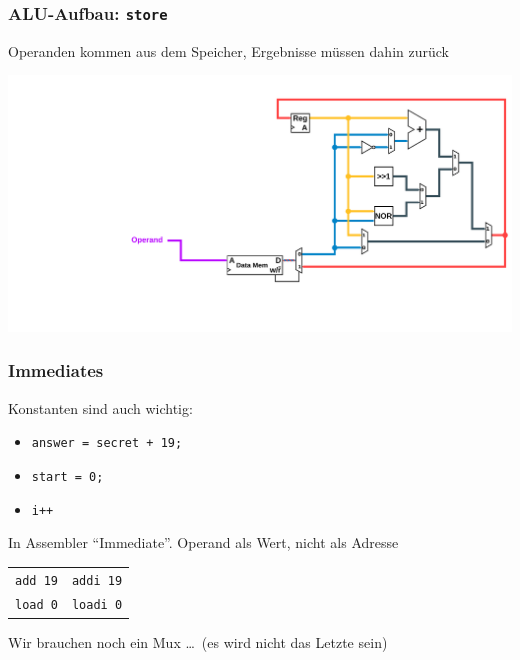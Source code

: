 \documentclass[t,aspectratio=169,usenames,dvipsnames]{beamer}
\begin{document}
\begin{frame}
  \frametitle{ALU-Aufbau: \texttt{store}}

  \strut{}Operanden kommen aus dem Speicher, Ergebnisse müssen dahin zurück

  \begin{center}
    \includegraphics[width=.85\textwidth]{sch-loadstore.pdf}
  \end{center}
\end{frame}

\begin{frame}
  \frametitle{Immediates}

  Konstanten sind auch wichtig:
  \begin{itemize}
  \item \texttt{answer = secret + 19;}
  \item \texttt{start = 0;}
  \item \texttt{i++}
  \end{itemize}

  \bigskip

  In Assembler \enquote{Immediate}. Operand als Wert, nicht als Adresse

  \medskip

  {\Large
    \begin{tabular}{ll}
      \texttt{add 19} & \texttt{addi 19} \\
      \texttt{load 0} & \texttt{loadi 0} \\
    \end{tabular}
  }

  \bigskip

  \pause
  Wir brauchen noch ein Mux \ldots\ (es wird nicht das Letzte sein)
\end{frame}
\end{document}

